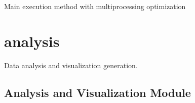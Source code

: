 \documentclass[a4paper,11pt,english,openany,oneside]{sphinxmanual}
\begin{document}
\begin{fulllineitems}
\begin{fulllineitems}
\end{fulllineitems}


\begin{fulllineitems}
\label{\detokenize{modules/core:core.averager.ReportAverager.run}}
\pysigstartsignatures
\pysiglinewithargsret
{}
{}
{}
\pysigstopsignatures
\sphinxAtStartPar
Main execution method with multiprocessing optimization

\end{fulllineitems}


\end{fulllineitems}


\begin{fulllineitems}
\label{\detokenize{modules/core:core.averager.main}}
\pysigstartsignatures
\pysiglinewithargsret
{}
{}
{}
\pysigstopsignatures
\end{fulllineitems}



\section{analysis}
\label{\detokenize{modules/core:analysis}}
\sphinxAtStartPar
Data analysis and visualization generation.

\subsection{Analysis and Visualization Module}
\label{\detokenize{modules/core:analysis-and-visualization-module}}\label{\detokenize{modules/core:module-core.analysis}}
\sphinxAtStartPar
\end{document}
